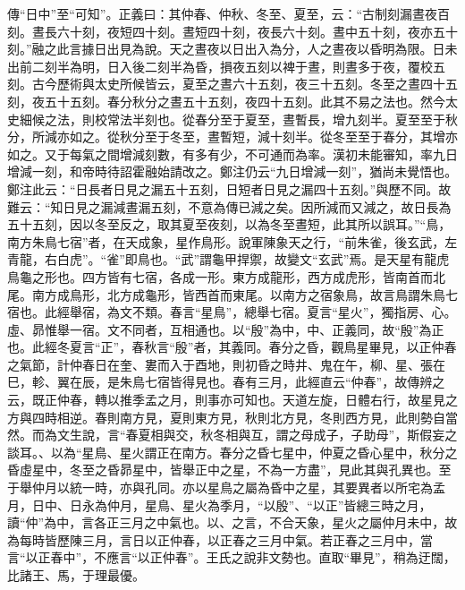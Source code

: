 {\noindent\zhuan{}\fzbyks 傳“日中”至“可知”。正義曰：其仲春、仲秋、冬至、夏至，云：“古制刻漏晝夜百刻。晝長六十刻，夜短四十刻。晝短四十刻，夜長六十刻。晝中五十刻，夜亦五十刻。”融之此言據日出見為說。天之晝夜以日出入為分，人之晝夜以昏明為限。日未出前二刻半為明，日入後二刻半為昏，損夜五刻以裨于晝，則晝多于夜，覆校五刻。古今歷術與太史所候皆云，夏至之晝六十五刻，夜三十五刻。冬至之晝四十五刻，夜五十五刻。春分秋分之晝五十五刻，夜四十五刻。此其不易之法也。然今太史細候之法，則校常法半刻也。從春分至于夏至，晝暫長，增九刻半。夏至至于秋分，所減亦如之。從秋分至于冬至，晝暫短，減十刻半。從冬至至于春分，其增亦如之。又于每氣之間增減刻數，有多有少，不可通而為率。漢初未能審知，率九日增減一刻，和帝時待詔霍融始請改之。鄭注仍云“九日增減一刻”，猶尚未覺悟也。鄭注此云：“日長者日見之漏五十五刻，日短者日見之漏四十五刻。”與歷不同。故難云：“知日見之漏減晝漏五刻，不意為傳已減之矣。因所減而又減之，故日長為五十五刻，因以冬至反之，取其夏至夜刻，以為冬至晝短，此其所以誤耳。”“鳥，南方朱鳥七宿”者，在天成象，星作鳥形。說軍陳象天之行，“前朱雀，後玄武，左青龍，右白虎”。“雀”即鳥也。“武”謂龜甲捍禦，故變文“玄武”焉。是天星有龍虎鳥龜之形也。四方皆有七宿，各成一形。東方成龍形，西方成虎形，皆南首而北尾。南方成鳥形，北方成龜形，皆西首而東尾。以南方之宿象鳥，故言鳥謂朱鳥七宿也。此經舉宿，為文不類。春言“星鳥”，總舉七宿。夏言“星火”，獨指房、心。虛、昴惟舉一宿。文不同者，互相通也。以“殷”為中，中、正義同，故“殷”為正也。此經冬夏言“正”，春秋言“殷”者，其義同。春分之昏，觀鳥星畢見，以正仲春之氣節，計仲春日在奎、婁而入于酉地，則初昏之時井、鬼在午，柳、星、張在巳，軫、翼在辰，是朱鳥七宿皆得見也。春有三月，此經直云“仲春”，故傳辨之云，既正仲春，轉以推季孟之月，則事亦可知也。天道左旋，日體右行，故星見之方與四時相逆。春則南方見，夏則東方見，秋則北方見，冬則西方見，此則勢自當然。而為文生說，言“春夏相與交，秋冬相與互，謂之母成子，子助母”，斯假妄之談耳。、以為“星鳥、星火謂正在南方。春分之昏七星中，仲夏之昏心星中，秋分之昏虛星中，冬至之昏昴星中，皆舉正中之星，不為一方盡”，見此其與孔異也。至于舉仲月以統一時，亦與孔同。亦以星鳥之屬為昏中之星，其要異者以所宅為孟月，日中、日永為仲月，星鳥、星火為季月，“以殷”、“以正”皆總三時之月，讀“仲”為中，言各正三月之中氣也。以、之言，不合天象，星火之屬仲月未中，故為每時皆歷陳三月，言日以正仲春，以正春之三月中氣。若正春之三月中，當言“以正春中”，不應言“以正仲春”。王氏之說非文勢也。直取“畢見”，稍為迂闊，比諸王、馬，于理最優。 \par}

